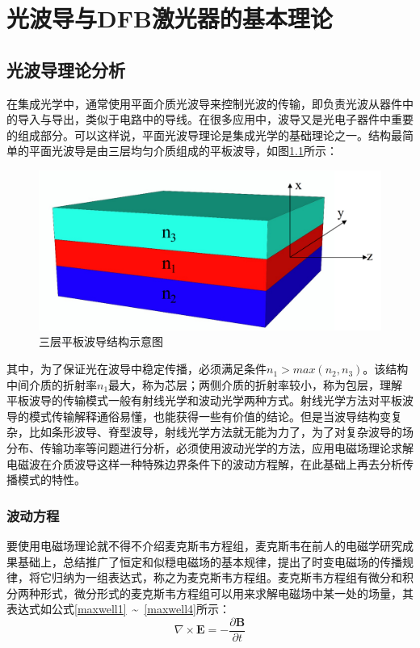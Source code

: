 \chapter{光波导与DFB激光器的基本理论}
\section{光波导理论分析}
在集成光学中，通常使用平面介质光波导来控制光波的传输，即负责光波从器件中的导入与导出，类似于电路中的导线。在很多应用中，波导又是光电子器件中重要的组成部分。可以这样说，平面光波导理论是集成光学的基础理论之一。结构最简单的平面光波导是由三层均匀介质组成的平板波导，如图\ref{fab_slab_waveguide}所示：

\begin{figure}[htb]
	\centering
	\includegraphics[width=12cm]{./Pictures/fab_slab_waveguide.jpg}
	\captionsetup{justification=centering}
	\caption{三层平板波导结构示意图}
	\label{fab_slab_waveguide}
\end{figure}

其中，为了保证光在波导中稳定传播，必须满足条件$n_{1}>max(n_{2},n_{3})$。该结构中间介质的折射率$n_{1}$最大，称为芯层；两侧介质的折射率较小，称为包层，理解平板波导的传输模式一般有射线光学和波动光学两种方式。射线光学方法对平板波导的模式传输解释通俗易懂，也能获得一些有价值的结论。但是当波导结构变复杂，比如条形波导、脊型波导，射线光学方法就无能为力了，为了对复杂波导的场分布、传输功率等问题进行分析，必须使用波动光学的方法，应用电磁场理论求解电磁波在介质波导这样一种特殊边界条件下的波动方程解，在此基础上再去分析传播模式的特性。

\subsection{波动方程}

要使用电磁场理论就不得不介绍麦克斯韦方程组，麦克斯韦在前人的电磁学研究成果基础上，总结推广了恒定和似穏电磁场的基本规律，提出了时变电磁场的传播规律，将它归纳为一组表达式，称之为麦克斯韦方程组。麦克斯韦方程组有微分和积分两种形式，微分形式的麦克斯韦方程组可以用来求解电磁场中某一处的场量，其表达式如公式\ref{maxwell1}~\~{}~\ref{maxwell4}所示：
\begin{equation}
\label{maxwell1}
\nabla \times \textbf{E} = -\dfrac{\partial\textbf{B}}{\partial t}
\end{equation}


